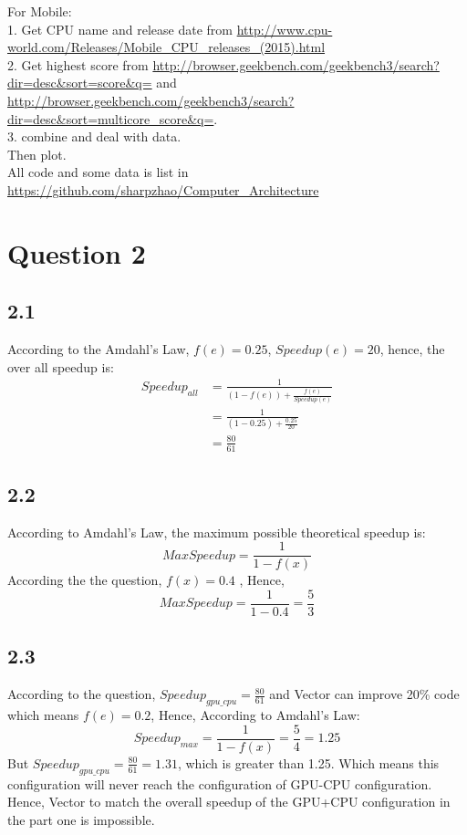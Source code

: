 \documentclass[a4paper,11pt,fleqn]{article}
\theoremstyle{mytheor}
\begin{document}
For Mobile:\\
1. Get CPU name and release date from \url{http://www.cpu-world.com/Releases/Mobile_CPU_releases_(2015).html}\\
2. Get highest score from \url{http://browser.geekbench.com/geekbench3/search?dir=desc&sort=score&q=} and \url{http://browser.geekbench.com/geekbench3/search?dir=desc&sort=multicore_score&q=}.\\
3. combine and deal with data.\\

Then plot.\\
All code and some data is list in \url{https://github.com/sharpzhao/Computer_Architecture}
\section*{Question 2}
\subsection*{2.1}
According to the Amdahl's Law, $f(e) = 0.25$, $Speedup(e) = 20$, hence, the over all speedup is:
\begin{equation}
\begin{split}
Speedup_{all} &= \frac{1}{(1 - f(e)) + \frac{f(e)}{Speedup(e)}}\\
&=\frac{1}{(1 - 0.25) + \frac{0.25}{20}}\\
&=\frac{80}{61}
\nonumber
\end{split}
\end{equation}

\subsection*{2.2}
According to Amdahl's Law, the maximum possible theoretical speedup is:
\begin{equation}
Max Speedup = \frac{1}{1 - f(x)}
\nonumber
\end{equation}
According the the question, $f(x) = 0.4$ , Hence, 
\begin{equation}
Max Speedup = \frac{1}{1 - 0.4} =\frac{5}{3}
\nonumber
\end{equation}

\subsection*{2.3}
According to the question, $Speedup_{gpu\_cpu} = \frac{80}{61}$ and Vector can improve 20\% code which means $f(e) = 0.2$, Hence, According to Amdahl's Law:
\begin{equation}
Speedup_{max} = \frac{1}{1 - f(x)} = \frac{5}{4} = 1.25
\nonumber
\end{equation}
But $Speedup_{gpu\_cpu} = \frac{80}{61} = 1.31$, which is greater than 1.25. Which means this configuration will never reach the configuration of GPU-CPU configuration.\\
Hence,  Vector to match the overall speedup of the GPU+CPU configuration in the part one  is impossible.
\end{document}
